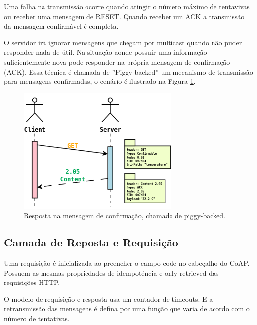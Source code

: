 Uma falha na transmiss\~ao ocorre quando atingir o n\'umero m\'aximo de tentavivas ou receber uma mensagem de RESET. Quando receber um ACK a transmiss\~ao da mensagem confirm\'avel \'e completa.

O servidor ir\'a ignorar mensagens que chegam por multicast quando n\~ao puder responder nada de \'util.
Na situa\c{c}\~ao aonde possuir uma informa\c{c}\~ao suficientemente nova pode responder na pr\'opria mensagem de confirma\c{c}\~ao (ACK). Essa t\'ecnica \'e chamada de ''Piggy-backed'' um mecanismo de transmiss\~ao para mensagens confirmadas, o cen\'ario \'e ilustrado na Figura \ref{fig:c}.\cite{draft-ietf-core-coap-18}

\begin{figure}
   \label{fig:c}
   \centering
   \includegraphics[width=0.7\textwidth]{figuras/piggybacked.png}
   \caption{Resposta na mensagem de confirma\c{c}\~ao, chamado de piggy-backed.}
\end{figure}

\subsection{Camada de Reposta e Requisi\c{c}\~ao}
Uma requisi\c{c}\~ao \'e inicializada ao preencher o campo code no cabe\c{c}alho do CoAP. Possuem as mesmas propriedades de idempot\'encia e only retrieved das requisi\c{c}\~oes HTTP.


O modelo de requisi\c{c}\~ao e resposta usa um contador de timeouts. E a retransmiss\~ao das mensagens \'e defina por uma fun\c{c}\~ao que varia de acordo com o n\'umero de tentativas.

